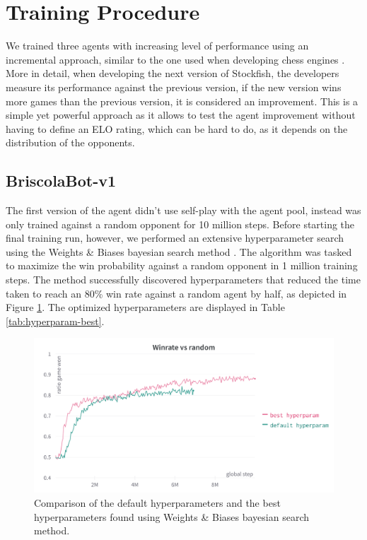 \section{Training Procedure}
We trained three agents with increasing level of performance using an incremental approach, similar to the one used when developing chess engines \cite{stockfish,lc0}. More in detail, when developing the next version of Stockfish, the developers measure its performance against the previous version, if the new version wins more games than the previous version, it is considered an improvement. This is a simple yet powerful approach as it allows to test the agent improvement without having to define an ELO rating, which can be hard to do, as it depends on the distribution of the opponents.

\subsection{BriscolaBot-v1}
The first version of the agent didn't use self-play with the agent pool, instead was only trained against a random opponent for 10 million steps. Before starting the final training run, however, we performed an extensive hyperparameter search using the Weights \& Biases bayesian search method \cite{wandb}. The algorithm was tasked to maximize the win probability against a random opponent in 1 million training steps. The method successfully discovered hyperparameters that reduced the time taken to reach an 80\% win rate against a random agent by half, as depicted in Figure \ref{fig:hyperparam-best-default}. The optimized hyperparameters are displayed in Table \ref{tab:hyperparam-best}.

\begin{figure}[H]
    \centering
    \includegraphics[width=\textwidth]{images/hyperparam-best-default.png}
    \caption{Comparison of the default hyperparameters and the best hyperparameters found using Weights \& Biases bayesian search method.}
    \label{fig:hyperparam-best-default}
\end{figure}

